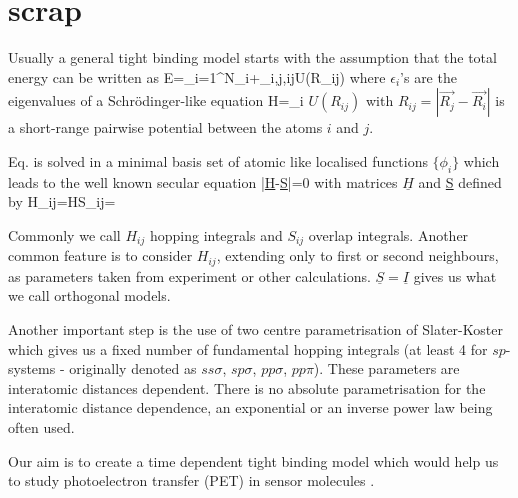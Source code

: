 \section{scrap}
\par{Usually a general tight binding model starts with the assumption that the
total energy can be written as}
\be
E=\sum_{i=1}^{N}\epsilon_i+\sum_{i,j,i\neq j}U(R_{ij})
\ee
where $\epsilon_i$'s are the eigenvalues of a Schr{\"o}dinger-like equation
\be
\label{eigenschro}
H=\epsilon_i
\ee
$U(R_{ij})$ with $R_{ij}=|\vec{R_j}-\vec{R_i}|$ is a short-range pairwise
potential between the atoms $i$ and $j$.
\par{Eq.  is solved in a minimal basis set of atomic like
localised functions $\{\phi_i\}$ which leads to the well known secular equation}
\be
|\underline{H}-\epsilon \underline{S}|=0
\ee
with matrices $\underline{H}$ and {\underline{S}} defined by
\be
H_{ij}=H\quad\quad S_{ij}=
\ee
\par{Commonly we call $H_{ij}$ hopping integrals and $S_{ij}$ overlap
integrals. Another common feature is to consider $H_{ij}$, extending only to
first or second neighbours, as parameters taken from experiment or other
calculations. $\underline{S}=\underline{I}$ gives us what we call orthogonal
models.}
\par{Another important step is the use of two centre parametrisation of
Slater-Koster which gives us a fixed number of fundamental hopping integrals
(at least 4 for $sp$-systems - originally denoted as $ss\sigma$, $sp\sigma$,
$pp\sigma$, $pp\pi$). These parameters are interatomic
distances dependent. There is no absolute parametrisation for the interatomic distance
dependence, an exponential or an inverse power law being often used.}
\par{Our aim is to create a time dependent tight binding model which would help us to study
photoelectron transfer (PET) in sensor molecules \citep{deSilva01b}.}
